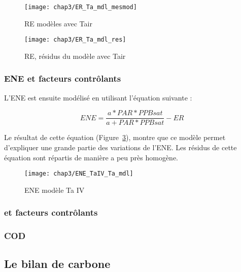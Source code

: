 \begin{figure}
\centering
\texttt{[image: chap3/ER\_Ta\_mdl\_mesmod]}
\caption{RE modèles avec Tair}
\label{fig:ER_Ta_mdl}
\end{figure}

\begin{figure}
\centering
\texttt{[image: chap3/ER\_Ta\_mdl\_res]}
\caption{RE, résidus du modèle avec Tair}
\label{fig:ER_Ta_res}
\end{figure}

\subsubsection{ENE et facteurs contrôlants}

L'ENE est ensuite modélisé en utilisant l'équation suivante :

\begin{equation}
ENE = \frac{a*PAR*PPBsat}{a+PAR*PPBsat}-ER
\end{equation}

Le résultat de cette équation (Figure~\ref{fig:ENE_Tair_mdl}), montre que ce modèle permet d'expliquer une grande partie des variations de l'ENE.
Les résidus de cette équation sont répartis de manière a peu près homogène.

\begin{figure}
\centering
\texttt{[image: chap3/ENE\_TaIV\_Ta\_mdl]}
\caption{ENE modèle Ta IV}
\label{fig:ENE_Tair_mdl}
\end{figure}


\subsubsection{\chh et facteurs contrôlants}

\subsubsection{COD}

\subsection{Le bilan de carbone}

